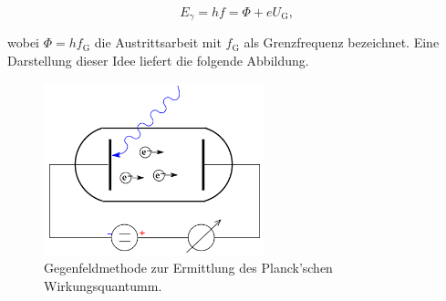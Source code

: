 \begin{equation}
    E_\gamma = hf = \Phi + eU_\text{G},
\label{eqn:Energiebilanz2}
\end{equation}

\noindent wobei $\Phi = hf_\text{G}$ die Austrittsarbeit mit $f_\text{G}$ als Grenzfrequenz bezeichnet. Eine Darstellung dieser Idee liefert die folgende Abbildung.

\begin{figure}
    \centering
    \includegraphics[height=5cm]{Gegenfeldmethode.png}
    \caption{Gegenfeldmethode zur Ermittlung des Planck'schen Wirkungsquantumm\cite{Versuchsanleitung_v500}.}
    \label{fig:Gegenfeldmethode}
\end{figure}


